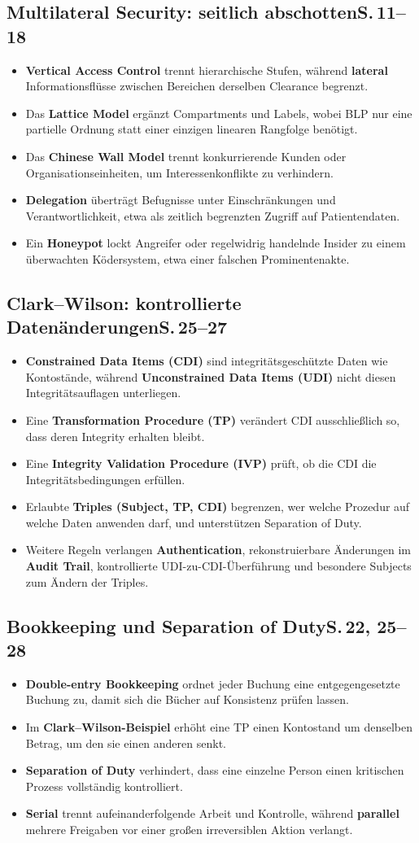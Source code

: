 \documentclass[11pt,a4paper]{article}
\newcommand{\block}[2]{\subsection*{#1\hfill{\normalfont\small #2}}}
\begin{document}
\block{Multilateral Security: seitlich abschotten}{S.\,11--18}
\begin{itemize}
\item \textbf{Vertical Access Control} trennt hierarchische Stufen, während \textbf{lateral} Informationsflüsse zwischen Bereichen derselben Clearance begrenzt.
\item Das \textbf{Lattice Model} ergänzt Compartments und Labels, wobei BLP nur eine partielle Ordnung statt einer einzigen linearen Rangfolge benötigt.
\item Das \textbf{Chinese Wall Model} trennt konkurrierende Kunden oder Organisationseinheiten, um Interessenkonflikte zu verhindern.
\item \textbf{Delegation} überträgt Befugnisse unter Einschränkungen und Verantwortlichkeit, etwa als zeitlich begrenzten Zugriff auf Patientendaten.
\item Ein \textbf{Honeypot} lockt Angreifer oder regelwidrig handelnde Insider zu einem überwachten Ködersystem, etwa einer falschen Prominentenakte.
\end{itemize}

\newpage
\block{Clark--Wilson: kontrollierte Datenänderungen}{S.\,25--27}
\begin{itemize}
\item \textbf{Constrained Data Items (CDI)} sind integritätsgeschützte Daten wie Kontostände, während \textbf{Unconstrained Data Items (UDI)} nicht diesen Integritätsauflagen unterliegen.
\item Eine \textbf{Transformation Procedure (TP)} verändert CDI ausschließlich so, dass deren Integrity erhalten bleibt.
\item Eine \textbf{Integrity Validation Procedure (IVP)} prüft, ob die CDI die Integritätsbedingungen erfüllen.
\item Erlaubte \textbf{Triples (Subject, TP, CDI)} begrenzen, wer welche Prozedur auf welche Daten anwenden darf, und unterstützen Separation of Duty.
\item Weitere Regeln verlangen \textbf{Authentication}, rekonstruierbare Änderungen im \textbf{Audit Trail}, kontrollierte UDI-zu-CDI-Überführung und besondere Subjects zum Ändern der Triples.
\end{itemize}

\block{Bookkeeping und Separation of Duty}{S.\,22, 25--28}
\begin{itemize}
\item \textbf{Double-entry Bookkeeping} ordnet jeder Buchung eine entgegengesetzte Buchung zu, damit sich die Bücher auf Konsistenz prüfen lassen.
\item Im \textbf{Clark--Wilson-Beispiel} erhöht eine TP einen Kontostand um denselben Betrag, um den sie einen anderen senkt.
\item \textbf{Separation of Duty} verhindert, dass eine einzelne Person einen kritischen Prozess vollständig kontrolliert.
\item \textbf{Serial} trennt aufeinanderfolgende Arbeit und Kontrolle, während \textbf{parallel} mehrere Freigaben vor einer großen irreversiblen Aktion verlangt.
\end{itemize}
\end{document}
